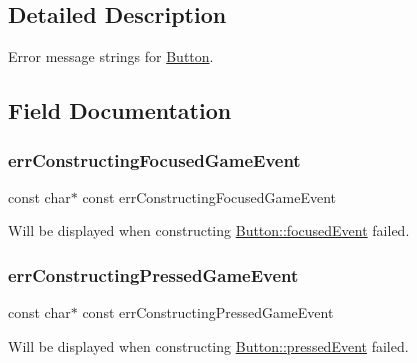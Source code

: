 \subsection{Detailed Description}
Error message strings for \hyperlink{struct_button}{Button}. 

\subsection{Field Documentation}
\hypertarget{struct_button_scene_node__error_messages_aa0aa63c6316692a9d676e9993a64a892}{}\label{struct_button_scene_node__error_messages_aa0aa63c6316692a9d676e9993a64a892} 
\subsubsection{\texorpdfstring{err\+Constructing\+Focused\+Game\+Event}{errConstructingFocusedGameEvent}}
{\footnotesize\ttfamily const char$\ast$ const err\+Constructing\+Focused\+Game\+Event}

Will be displayed when constructing \hyperlink{struct_button_af8909553495b609dc7c9efd469ffc31d}{Button\+::focused\+Event} failed. \hypertarget{struct_button_scene_node__error_messages_ac4bb16972806698fabe7f2a720f09657}{}\label{struct_button_scene_node__error_messages_ac4bb16972806698fabe7f2a720f09657} 
\subsubsection{\texorpdfstring{err\+Constructing\+Pressed\+Game\+Event}{errConstructingPressedGameEvent}}
{\footnotesize\ttfamily const char$\ast$ const err\+Constructing\+Pressed\+Game\+Event}

Will be displayed when constructing \hyperlink{struct_button_a6c6350ebecb76824f44acd4af5310894}{Button\+::pressed\+Event} failed. \hypertarget{struct_button_scene_node__error_messages_aff52e1524b98973729b8be6b9cb58421}{}\label{struct_button_scene_node__error_messages_aff52e1524b98973729b8be6b9cb58421} 
